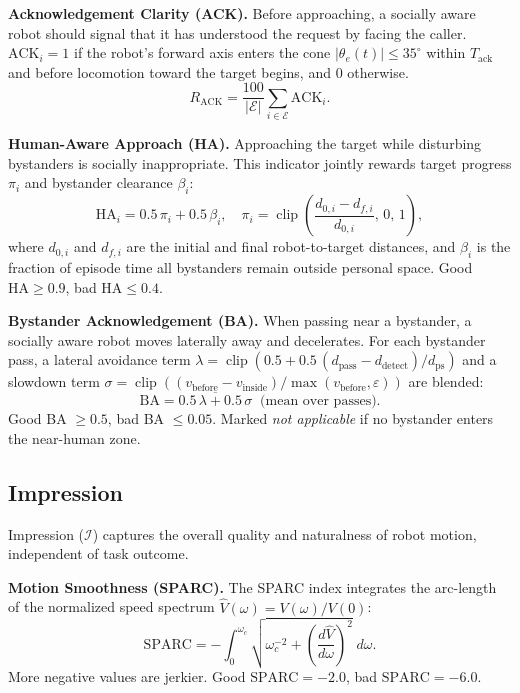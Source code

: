\documentclass[conference]{IEEEtran}
\begin{document}
\textbf{Acknowledgement Clarity (ACK).}
Before approaching, a socially aware robot should signal that it has
understood the request by facing the caller.
$\text{ACK}_i = 1$ if the robot's forward axis enters the cone
$|\theta_e(t)| \le 35^\circ$ within $T_\text{ack}$ and before locomotion
toward the target begins, and $0$ otherwise.
\begin{equation}
	R_\text{ACK} = \frac{100}{|\mathcal{E}|}
	\sum_{i \in \mathcal{E}} \text{ACK}_i.
\end{equation}

\textbf{Human-Aware Approach (HA).}
Approaching the target while disturbing bystanders is socially inappropriate.
This indicator jointly rewards target progress $\pi_i$ and bystander
clearance $\beta_i$:
\begin{equation}
	\text{HA}_i = 0.5\,\pi_i + 0.5\,\beta_i, \quad
	\pi_i = \operatorname{clip}\!\left(
	\frac{d_{0,i} - d_{f,i}}{d_{0,i}},\,0,\,1\right),
	\label{eq:ha}
\end{equation}
where $d_{0,i}$ and $d_{f,i}$ are the initial and final robot-to-target
distances, and $\beta_i$ is the fraction of episode time all bystanders
remain outside personal space.
Good $\text{HA} \ge 0.9$, bad $\text{HA} \le 0.4$.

\textbf{Bystander Acknowledgement (BA).}
When passing near a bystander, a socially aware robot moves laterally away and
decelerates. For each bystander pass, a lateral avoidance term
$\lambda = \operatorname{clip}(0.5 + 0.5\,(d_\text{pass} - d_\text{detect})/d_\text{ps})$
and a slowdown term $\sigma = \operatorname{clip}((v_\text{before} - v_\text{inside})/\max(v_\text{before},\varepsilon))$
are blended:
\begin{equation}
	\text{BA} = \overline{0.5\,\lambda + 0.5\,\sigma}\ \text{ (mean over passes)}.
\end{equation}
Good BA $\ge 0.5$, bad BA $\le 0.05$.
Marked \textit{not applicable} if no bystander enters the near-human zone.

\subsection{Impression}

Impression ($\mathcal{I}$) captures the overall quality and naturalness of
robot motion, independent of task outcome.

\textbf{Motion Smoothness (SPARC).}
The SPARC index \cite{balasubramanian2012sparc} integrates the arc-length of the normalized
speed spectrum $\hat{V}(\omega) = V(\omega)/V(0)$:
\begin{equation}
	\text{SPARC} = -\int_0^{\omega_c}
	\sqrt{\omega_c^{-2} +
		\left(\frac{d\hat{V}}{d\omega}\right)^{\!2}}\;d\omega.
	\label{eq:sparc}
\end{equation}
More negative values are jerkier.
Good $\text{SPARC} = -2.0$, bad $\text{SPARC} = -6.0$.
\end{document}
